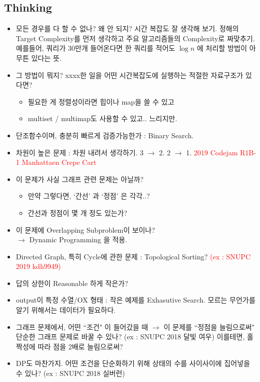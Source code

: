 \documentclass[landscape,8pt]{article}
\begin{document}
\begin{multicols}{2}
  \subsection{Thinking}
    \begin{itemize}
      \item 모든 경우를 다 할 수 없나? 왜 안 되지? 시간 복잡도 잘 생각해 보기. 정해의 Target Complexity를 먼저 생각하고 주요 알고리즘들의 Complexity로 짜맞추기.\\
      예를들어, 쿼리가 30만개 들어온다면 한 쿼리를 적어도 $\log{n}$ 에 처리할 방법이 아무튼 있다는 뜻.
      \item 그 방법이 뭐지? xxxx한 일을 어떤 시간복잡도에 실행하는 적절한 자료구조가 있다면?
      \begin{itemize}
        \item 필요한 게 정렬성이라면 힙이나 map을 쓸 수 있고
        \item multiset / multimap도 사용할 수 있고.. 느리지만.
      \end{itemize}
      \item 단조함수이며, 충분히 빠르게 검증가능한가 : Binary Search.
      \item 차원이 높은 문제 : 차원 내려서 생각하기. 3 $\rightarrow$ 2. 2 $\rightarrow$ 1. \textcolor{red}{2019 Codejam R1B-1 Manhattaen Crepe Cart}
      \item 이 문제가 사실 그래프 관련 문제는 아닐까?
        \begin{itemize}
          \item 만약 그렇다면, `간선' 과 `정점' 은 각각..?
          \item 간선과 정점이 몇 개 정도 있는가?
        \end{itemize}
      \item 이 문제에 Overlapping Subproblem이 보이나? \\$\rightarrow$ Dynamic Programming 을 적용.
      \item Directed Graph, 특히 Cycle에 관한 문제 : Topological Sorting? \textcolor{red}{(ex : SNUPC 2019 kdh9949)}
      \item 답의 상한이 Reasonable 하게 작은가?
      \item output이 특정 수열/OX 형태 : 작은 예제를 Exhasutive Search. 모르는 무언가를 알기 위해서는 데이터가 필요하다.
      \item 그래프 문제에서, 어떤 ``조건" 이 들어갔을 때 $\to$ 이 문제를 ``정점을 늘림으로써" 단순한 그래프 문제로 바꿀 수 있나? (ex : SNUPC 2018 달빛 여우) 이를테면, 홀짝성에 따라 점을 2배로 늘림으로써?
      \item DP도 마찬가지. 어떤 조건을 단순화하기 위해 상태의 수를 사이사이에 집어넣을 수 있나? (ex : SNUPC 2018 실버런)

\end{itemize}
\end{multicols}
\end{document}
